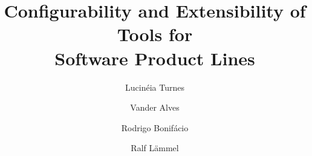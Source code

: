 \documentclass[preprint,12pt]{elsarticle}
\newcommand{\hpl}{\textsf{Hephaestus-PL}}
\begin{document}
\begin{frontmatter}



\title{Configurability and Extensibility of Tools for\\ Software Product
Lines}


\author[unb]{Lucin\'{e}ia Turnes}
\author[unb]{Vander Alves}
\author[unb]{Rodrigo Bonif\'{a}cio}
\author[ukob]{Ralf L\"{a}mmel}

\address[unb]{Departamento de Ci\^{e}ncia da Computa\c{c}\~{a}o, Universidade de Bras\'{i}lia, Campus Darcy Ribeiro, Bras\'{i}lia, Brazil, 70910-900}
\address[ukob]{Software Languages Team, Universit\"{a}t Koblenz-Landau, Institut f\"{u}r Informatik, Universittsstra\ss{}e 1, D-56070 Koblenz, Germany}

\author{}

\address{}


\end{frontmatter}
\end{document}
